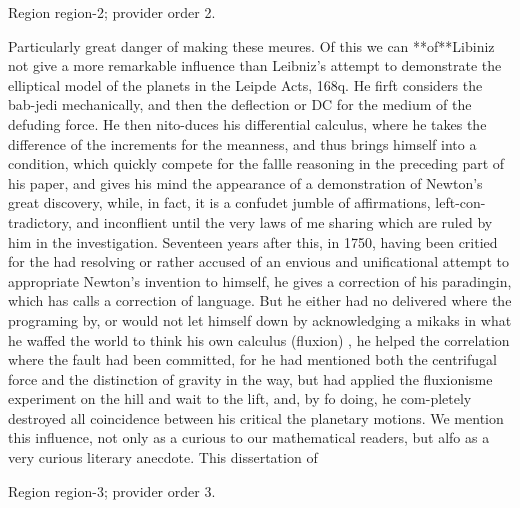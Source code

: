 \documentclass[11pt]{article}
\begin{document}
{\scriptsize\color{gray} Region region-2; provider order 2.\par}
\medskip

Particularly great danger of making these meures. Of this we can **of**Libiniz not give a more remarkable influence than Leibniz’s attempt to demonstrate the elliptical model of the planets in the Leipde Acts, 168q. He firft considers the bab-jedi mechanically, and then the deflection or DC for the medium of the defuding force. He then nito-duces his differential calculus, where he takes the difference of the increments for the meanness, and thus brings himself into a condition, which quickly compete for the fallle reasoning in the preceding part of his paper, and gives his mind the appearance of a demonstration of Newton's great discovery, while, in fact, it is a confudet jumble of affirmations, left-con- tradictory, and inconflient until the very laws of me sharing which are ruled by him in the investigation. Seventeen years after this, in 1750, having been critied for the had resolving or rather accused of an envious and unificational attempt to appropriate Newton's invention to himself, he gives a correction of his paradingin, which has calls a correction of language. But he either had no delivered where the programing by, or would not let himself down by acknowledging a mikaks in what he waffed the world to think his own calculus (fluxion) , he helped the correlation where the fault had been committed, for he had mentioned both the centrifugal force and the distinction of gravity in the way, but had applied the fluxionisme experiment on the hill and wait to the lift, and, by fo doing, he com-pletely destroyed all coincidence between his critical the planetary motions. We mention this influence, not only as a curious to our mathematical readers, but alfo as a very curious literary anecdote. This dissertation of
\par

{\scriptsize\color{gray} Region region-3; provider order 3.\par}
\medskip
\end{document}
